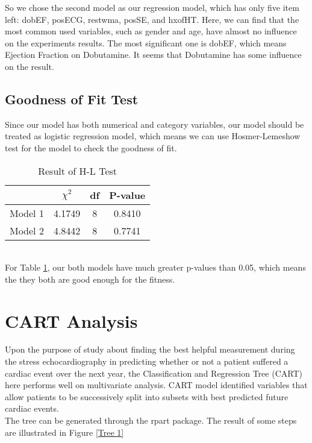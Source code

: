 \documentclass[a4paper,12pt]{article}
\begin{document}
So we chose the second model as our regression model, which has only five item left: dobEF, posECG, restwma, posSE, and hxofHT. Here, we can find that the most common used variables, such as gender and age, have almost no influence on the experiments results. The most significant one is dobEF, which means Ejection Fraction on Dobutamine. It seems that Dobutamine has some influence on the result.
  \subsection{Goodness of Fit Test}
  Since our model has both numerical and category variables, our model should be treated as logistic regression model, which means we can use Hosmer-Lemeshow test for the model to check the goodness of fit.
  \begin{table}[htbp]
    \centering
    \caption{Result of H-L Test}
      \begin{tabular}{cccc}
      \toprule
            & $ {\chi}^2$ & df    & P-value \\
      \midrule
      Model 1 & 4.1749 & 8     & 0.8410 \\
      Model 2 & 4.8442 & 8     & 0.7741 \\
      \bottomrule
      \end{tabular}%
    \label{HL}%
  \end{table}\\
  For Table \ref{HL}, our both models have much greater p-values than 0.05, which means the they both are good enough for the fitness.

\section{CART Analysis}
  Upon the purpose of study about finding the best helpful measurement during the stress echocardiography in predicting whether or not a patient suffered a cardiac event over the next year, the Classification and Regression Tree (CART) here performs well on multivariate analysis. CART model identified variables that allow patients to be successively split into subsets with best predicted future cardiac events.\\
  The tree can be generated through the rpart package. The result of some steps are illustrated in Figure \ref{Tree 1}
\end{document}
